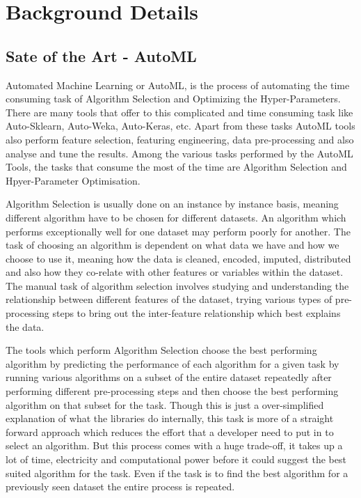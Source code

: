 \chapter{Background Details}

\section{Sate of the Art - AutoML}
Automated Machine Learning or AutoML, is the process of automating the time consuming task of Algorithm Selection and Optimizing the Hyper-Parameters. There are many tools that offer to this complicated and time consuming task like Auto-Sklearn, Auto-Weka, Auto-Keras, etc. Apart from these tasks AutoML tools also perform feature selection, featuring engineering, data pre-processing and also analyse and tune the results. Among the various tasks performed by the AutoML Tools, the tasks that consume the most of the time are Algorithm Selection and Hpyer-Parameter Optimisation. 

Algorithm Selection is usually done on an instance by instance basis, meaning different algorithm have to be chosen for different datasets. An algorithm which performs exceptionally well for one dataset may perform poorly for another. The task of choosing an algorithm is dependent on what data we have and how we choose to use it, meaning how the data is cleaned, encoded, imputed, distributed and also how they co-relate with other features or variables within the dataset. The manual task of algorithm selection involves studying and understanding the relationship between different features of the dataset, trying various types of pre-processing steps to bring out the inter-feature relationship which best explains the data. 

The tools which perform Algorithm Selection choose the best performing algorithm by predicting the performance of each algorithm for a given task by running various algorithms on a subset of the entire dataset repeatedly after performing different pre-processing steps and then choose the best performing algorithm on that subset for the task. Though this is just a over-simplified explanation of what the libraries do internally, this task is more of a straight forward approach which reduces the effort that a developer need to put in to select an algorithm. But this process comes with a huge trade-off, it takes up a lot of time, electricity and computational power before it could suggest the best suited algorithm for the task. Even if the task is to find the best algorithm for a previously seen dataset the entire process is repeated.


